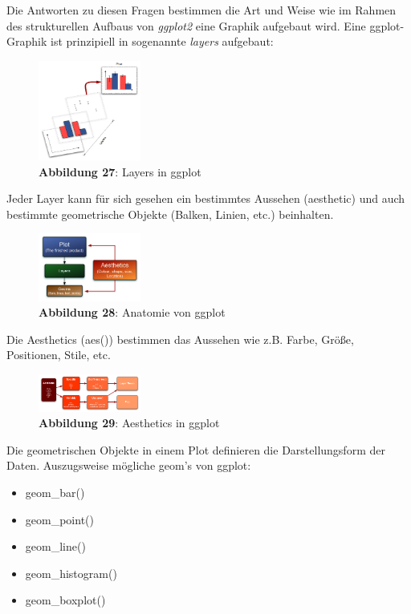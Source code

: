 \documentclass[]{article}
\providecommand{\tightlist}{%
  \setlength{\itemsep}{0pt}\setlength{\parskip}{0pt}}
\begin{document}
Die Antworten zu diesen Fragen bestimmen die Art und Weise wie im Rahmen
des strukturellen Aufbaus von \emph{ggplot2} eine Graphik aufgebaut
wird. Eine ggplot-Graphik ist prinzipiell in sogenannte \emph{layers}
aufgebaut:

\begin{figure}
\centering
\includegraphics[width=0.30000\textwidth]{Images/08_ggplot_Layers.PNG}
\caption{\textbf{Abbildung 27}: Layers in ggplot}
\end{figure}

Jeder Layer kann für sich gesehen ein bestimmtes Aussehen (aesthetic)
und auch bestimmte geometrische Objekte (Balken, Linien, etc.)
beinhalten.

\begin{figure}
\centering
\includegraphics[width=0.30000\textwidth]{Images/08_ggplot_Anatomy.PNG}
\caption{\textbf{Abbildung 28}: Anatomie von ggplot}
\end{figure}

Die Aesthetics (aes()) bestimmen das Aussehen wie z.B. Farbe, Größe,
Positionen, Stile, etc.

\begin{figure}
\centering
\includegraphics[width=0.30000\textwidth]{Images/08_ggplot_Aesthetics.PNG}
\caption{\textbf{Abbildung 29}: Aesthetics in ggplot}
\end{figure}

Die geometrischen Objekte in einem Plot definieren die Darstellungsform
der Daten. Auszugsweise mögliche geom's von ggplot:

\begin{itemize}
\tightlist
\item
  geom\_bar()
\item
  geom\_point()
\item
  geom\_line()
\item
  geom\_histogram()
\item
  geom\_boxplot()
\end{itemize}
\end{document}
